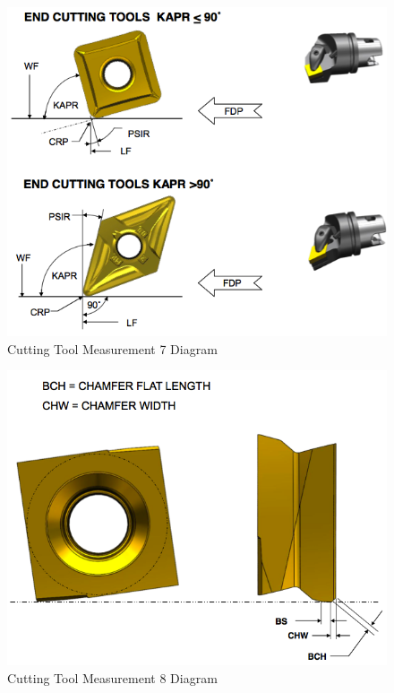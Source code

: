 \FloatBarrier


\begin{figure}[ht]
  \centering
    \includegraphics[width=1.0\textwidth]{figures/Cutting Tool Measurement 7.png}
  \caption{Cutting Tool Measurement 7 Diagram}
  \label{fig:Cutting Tool Measurement 7 Diagram}
\end{figure}

\FloatBarrier


\begin{figure}[ht]
  \centering
    \includegraphics[width=1.0\textwidth]{figures/Cutting Tool Measurement 8.png}
  \caption{Cutting Tool Measurement 8 Diagram}
  \label{fig:Cutting Tool Measurement 8 Diagram}
\end{figure}

